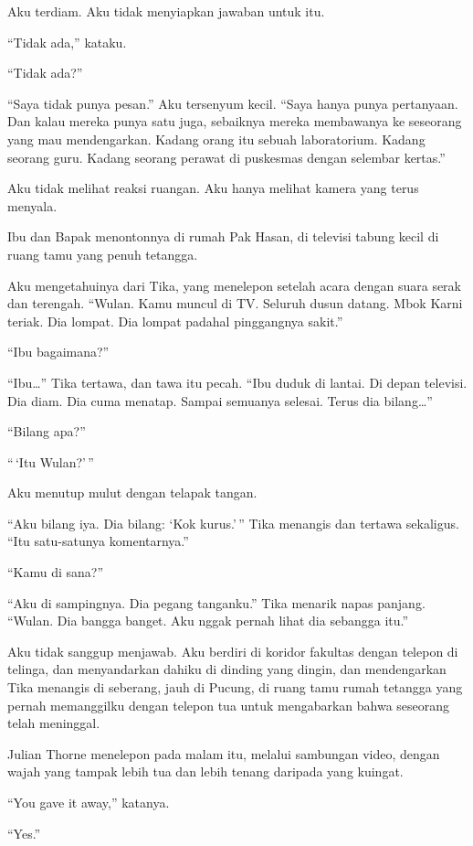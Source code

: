 \documentclass[11pt,twoside,openany]{book}
\makeatletter
\newcommand{\scenebreak}{\par\vspace{0.9em}{\centering\textsc{*\hspace{0.7em}*\hspace{0.7em}*}\par}\vspace{0.9em}\@afterindentfalse\@afterheading}
\makeatother
\begin{document}
Aku terdiam. Aku tidak menyiapkan jawaban untuk itu.

``Tidak ada,'' kataku.

``Tidak ada?''

``Saya tidak punya pesan.'' Aku tersenyum kecil. ``Saya hanya punya pertanyaan. Dan kalau mereka punya satu juga, sebaiknya mereka membawanya ke seseorang yang mau mendengarkan. Kadang orang itu sebuah laboratorium. Kadang seorang guru. Kadang seorang perawat di puskesmas dengan selembar kertas.''

Aku tidak melihat reaksi ruangan. Aku hanya melihat kamera yang terus menyala.

\scenebreak
Ibu dan Bapak menontonnya di rumah Pak Hasan, di televisi tabung kecil di ruang tamu yang penuh tetangga.

Aku mengetahuinya dari Tika, yang menelepon setelah acara dengan suara serak dan terengah. ``Wulan. Kamu muncul di TV. Seluruh dusun datang. Mbok Karni teriak. Dia lompat. Dia lompat padahal pinggangnya sakit.''

``Ibu bagaimana?''

``Ibu\ldots{}'' Tika tertawa, dan tawa itu pecah. ``Ibu duduk di lantai. Di depan televisi. Dia diam. Dia cuma menatap. Sampai semuanya selesai. Terus dia bilang\ldots{}''

``Bilang apa?''

``\,`Itu Wulan?'\,''

Aku menutup mulut dengan telapak tangan.

``Aku bilang iya. Dia bilang: `Kok kurus.'\,'' Tika menangis dan tertawa sekaligus. ``Itu satu-satunya komentarnya.''

``Kamu di sana?''

``Aku di sampingnya. Dia pegang tanganku.'' Tika menarik napas panjang. ``Wulan. Dia bangga banget. Aku nggak pernah lihat dia sebangga itu.''

Aku tidak sanggup menjawab. Aku berdiri di koridor fakultas dengan telepon di telinga, dan menyandarkan dahiku di dinding yang dingin, dan mendengarkan Tika menangis di seberang, jauh di Pucung, di ruang tamu rumah tetangga yang pernah memanggilku dengan telepon tua untuk mengabarkan bahwa seseorang telah meninggal.

\scenebreak
Julian Thorne menelepon pada malam itu, melalui sambungan video, dengan wajah yang tampak lebih tua dan lebih tenang daripada yang kuingat.

``You gave it away,'' katanya.

``Yes.''
\end{document}
